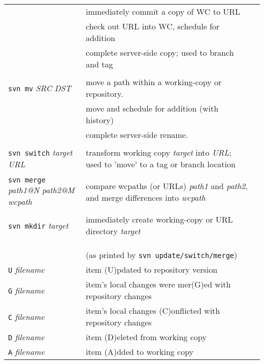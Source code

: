 \documentclass{report}
\begin{document}
\begin{tabular}{lp{3in}p{2in}}
\hspace{0.5in}{\tt WC => URL}		&
immediately commit a copy of WC to URL & \\

\hspace{0.5in}{\tt URL => WC}		&
check out URL into WC, schedule for addition & \\

\hspace{0.5in}{\tt URL => URL}		&
complete server-side copy;  used to branch and tag & \\

\\
{\tt svn mv} {\sl SRC} {\sl DST}		&
move a path within a working-copy or repository. & \\

\hspace{0.5in}{\tt WC => WC}		&
move and schedule for addition (with history) & \\

\hspace{0.5in}{\tt URL => URL}		&
complete server-side rename. & \\

\\
{\tt svn switch} {\sl target} {\sl URL}		&
transform working copy {\sl target} into {\sl URL}; used to 'move' to
a tag or branch location  & \\

\\
{\tt svn merge} {\sl path1@N} {\sl path2@M} {\sl wcpath}	&
compare wcpaths (or URLs) {\sl path1} and {\sl path2}, and merge differences
into {\sl wcpath}& \\

\\
{\tt svn mkdir} {\sl target}		&
immediately create working-copy or URL directory {\sl target}  & \\
						& \\
\\
\\
\vspace{0.1in} \hspace{-0.1in}{\bf\Large File Status Flags} &
(as printed by {\tt svn update/switch/merge})		& \\

{\tt U} {\sl filename}				&
item (U)pdated to repository version	 	& \\

{\tt G} {\sl filename}				&
item's local changes were mer(G)ed with repository changes &\\

{\tt C} {\sl filename}				&
item's local changes (C)onflicted with repository changes &\\

{\tt D} {\sl filename}				&
item (D)eleted from working copy                &\\

{\tt A} {\sl filename}				&
item (A)dded to working copy			& \\

\end{tabular}
\end{document}
